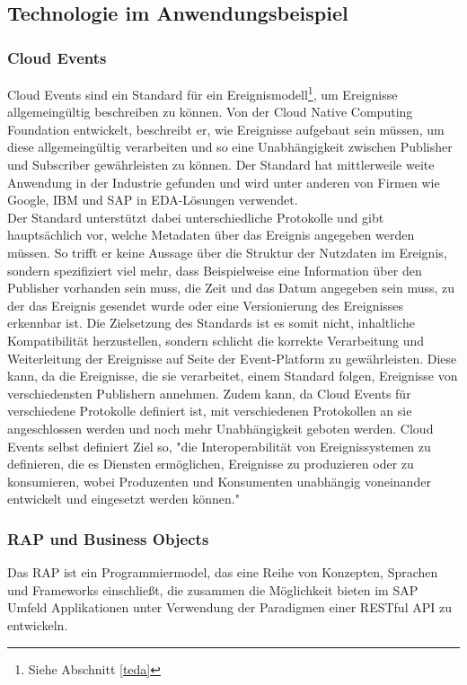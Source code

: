 \subsection{Technologie im Anwendungsbeispiel}

\subsubsection*{Cloud Events}
\label{cloudev}
Cloud Events sind ein Standard für ein Ereignismodell\footnote{Siehe Abschnitt \ref*{teda}}, um Ereignisse allgemeingültig beschreiben zu können. Von der Cloud Native Computing Foundation entwickelt, beschreibt er, wie Ereignisse aufgebaut sein müssen, um diese allgemeingültig verarbeiten und so eine Unabhängigkeit zwischen Publisher und Subscriber gewährleisten zu können. Der Standard hat mittlerweile weite Anwendung in der Industrie gefunden und wird unter anderen von Firmen wie Google, IBM und SAP in \ac{EDA}-Lösungen verwendet. \citepls \\
Der Standard unterstützt dabei unterschiedliche Protokolle und gibt hauptsächlich vor, welche Metadaten über das Ereignis angegeben werden müssen. So trifft er keine Aussage über die Struktur der Nutzdaten im Ereignis, sondern spezifiziert viel mehr, dass Beispielweise eine Information über den Publisher vorhanden sein muss, die Zeit und das Datum angegeben sein muss, zu der das Ereignis gesendet wurde oder eine Versionierung des Ereignisses erkennbar ist. Die Zielsetzung des Standards ist es somit nicht, inhaltliche Kompatibilität herzustellen, sondern schlicht die korrekte Verarbeitung und Weiterleitung der Ereignisse auf Seite der Event-Platform zu gewährleisten. Diese kann, da die Ereignisse, die sie verarbeitet, einem Standard folgen, Ereignisse von verschiedensten Publishern annehmen. Zudem kann, da Cloud Events für verschiedene Protokolle definiert ist, mit verschiedenen Protokollen an sie angeschlossen werden und noch mehr Unabhängigkeit geboten werden. Cloud Events selbst definiert Ziel so, "die Interoperabilität von Ereignissystemen zu definieren, die es Diensten ermöglichen, Ereignisse zu produzieren oder zu konsumieren, wobei Produzenten und Konsumenten unabhängig voneinander entwickelt und eingesetzt werden können."\citepls

\subsubsection*{RAP und Business Objects}
Das \ac{RAP} ist ein Programmiermodel, das eine Reihe von Konzepten, Sprachen und Frameworks einschließt, die zusammen die Möglichkeit bieten im SAP Umfeld Applikationen unter Verwendung der Paradigmen einer \ac*{REST}ful \ac{API} zu entwickeln. \citepls

